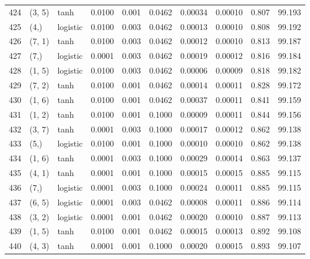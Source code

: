 \begin{tabular}{lllrrrrrrr}
424 &      (3, 5) &      tanh &  0.0100 &  0.001 &  0.0462 &          0.00034 &    0.00010 &       0.807 &    99.193 \\
425 &        (4,) &  logistic &  0.0100 &  0.003 &  0.0462 &          0.00013 &    0.00010 &       0.808 &    99.192 \\
426 &      (7, 1) &      tanh &  0.0100 &  0.003 &  0.0462 &          0.00012 &    0.00010 &       0.813 &    99.187 \\
427 &        (7,) &  logistic &  0.0001 &  0.003 &  0.0462 &          0.00019 &    0.00012 &       0.816 &    99.184 \\
428 &      (1, 5) &  logistic &  0.0100 &  0.003 &  0.0462 &          0.00006 &    0.00009 &       0.818 &    99.182 \\
429 &      (7, 2) &      tanh &  0.0100 &  0.001 &  0.0462 &          0.00014 &    0.00011 &       0.828 &    99.172 \\
430 &      (1, 6) &      tanh &  0.0100 &  0.001 &  0.0462 &          0.00037 &    0.00011 &       0.841 &    99.159 \\
431 &      (1, 2) &      tanh &  0.0100 &  0.001 &  0.1000 &          0.00009 &    0.00011 &       0.844 &    99.156 \\
432 &      (3, 7) &      tanh &  0.0001 &  0.003 &  0.1000 &          0.00017 &    0.00012 &       0.862 &    99.138 \\
433 &        (5,) &  logistic &  0.0100 &  0.001 &  0.1000 &          0.00010 &    0.00010 &       0.862 &    99.138 \\
434 &      (1, 6) &      tanh &  0.0001 &  0.003 &  0.1000 &          0.00029 &    0.00014 &       0.863 &    99.137 \\
435 &      (4, 1) &      tanh &  0.0001 &  0.001 &  0.1000 &          0.00015 &    0.00015 &       0.885 &    99.115 \\
436 &        (7,) &  logistic &  0.0001 &  0.003 &  0.1000 &          0.00024 &    0.00011 &       0.885 &    99.115 \\
437 &      (6, 5) &  logistic &  0.0001 &  0.003 &  0.0462 &          0.00008 &    0.00011 &       0.886 &    99.114 \\
438 &      (3, 2) &  logistic &  0.0001 &  0.001 &  0.0462 &          0.00020 &    0.00010 &       0.887 &    99.113 \\
439 &      (1, 5) &      tanh &  0.0100 &  0.001 &  0.0462 &          0.00015 &    0.00013 &       0.892 &    99.108 \\
440 &      (4, 3) &      tanh &  0.0001 &  0.001 &  0.1000 &          0.00020 &    0.00015 &       0.893 &    99.107 \\

\end{tabular}
